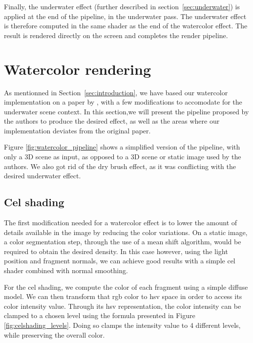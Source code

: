 \documentclass{article}
\begin{document}
\medskip \par
\noindent
Finally, the underwater effect (further described in section~\ref{sec:underwater}) is applied at 
the end of the pipeline, in the underwater pass. The underwater effect is therefore computed in 
the same shader as the end of the watercolor effect. The result is rendered directly on the screen 
and completes the render pipeline.

\section{Watercolor rendering}
\label{sec:watercolor}

As mentionned in Section~\ref{sec:introduction}, we have based our watercolor implementation on a paper by 
\cite{watercolor_paper}, with a few modifications to accomodate for the underwater scene context. 
In this section,we will present the pipeline proposed by the authors to produce the desired effect, 
as well as the areas where our implementation deviates from the original paper. 

\medskip \par
\noindent
Figure \ref{fig:watercolor_pipeline} shows a simplified version of the pipeline, with only a 3D scene as input, 
as opposed to a 3D scene or static image used by the authors. We also got rid of the dry brush effect, as it 
was conflicting with the desired underwater effect.

\subsection{Cel shading}

The first modification needed for a watercolor effect is to lower the amount of details available 
in the image by reducing the color variations. On a static image, a color segmentation step, through the use
of a mean shift algorithm, would be required to obtain the desired density. In this case however, using the 
light position and fragment normals, we can achieve good results with a simple cel shader combined with 
normal smoothing.

\medskip \par
\noindent
For the cel shading, we compute the color of each fragment using a simple diffuse model. 
We can then transform that rgb color to hsv space in order to access its color intensity value. 
Through its hsv representation, the color intensity can be clamped to a chosen level using the formula
presented in Figure \ref{fig:celshading_levels}. 
Doing so clamps the intensity value to 4 different levels, while preserving the overall color.
\end{document}
